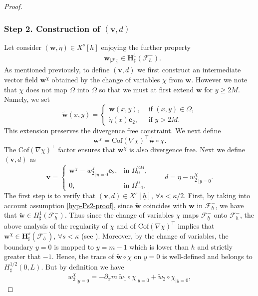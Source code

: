 \documentclass[JEP,XML,SOM,Unicode,NoFloatCountersInSection]{cedram}
\let\mathcal\mathscr
\theoremstyle{remark}
\theoremstyle{definition}
\newcommand{\vg}{\boldsymbol{v}}
\newcommand{\wg}{\boldsymbol{w}}
\newcommand{\BS}[1]{\boldsymbol{#1}}
\newcommand{\etap}{\dot{\eta}}
\newcommand{\hb}{{\underline{h}}}
\newcommand{\Cof}{\mathrm{Cof}}
\begin{document}
\begin{proof}
\subsubsection*{Step 2. Construction of $(\vg,d)$}
Let consider $(\wg,\etap) \in X^s[h]$ enjoying the further property
\begin{eqnarray}
&\wg_{\vert\mathcal{F}_{h}^{-}}\in \BS{H}^{1}_{\sharp}(\mathcal{F}^{-}_{h}).\label{hyp-Ps2-proof}
\end{eqnarray}
As mentioned previously, to define $(\vg,d)$ we first construct an intermediate vector field
$\wg^{\chi}$ obtained by the change of variables $\chi$ from $\wg$. However we note that
$\chi$ does not map $\Omega$ into $\Omega$ so that we must at first extend $\wg$ for
$y\geq 2 M$. Namely, we set
\[
\tilde{\wg}(x,y) =
\begin{cases}
\wg(x,y), & \text{ if $(x,y) \in \Omega$}, \\
\etap(x)\BS{e}_{2}, & \text{ if $y >2M$}.
\end{cases}
\]
This extension preserves the divergence free constraint.
We next define
\[\wg^\chi = \Cof(\nabla \chi)^{\top}\tilde{\wg}\circ \chi.\]
The $\Cof(\nabla \chi)^{\top}$ factor ensures that $\wg^\chi$ is also divergence free.
Next we define $(\vg,d)$ as
\begin{equation}\label{def.v.b}
\vg=\begin{cases}
\wg^\chi -{w_{2}^\chi}_{|{y=0}}\BS{e}_{2}, & \text{in } \Omega^{2M}_{0},\\
0, & \text{in }\Omega^{0}_{-1},
\end{cases}
\qquad
d=\etap -{w_{2}^\chi}_{|{y=0}}.
\end{equation}
The first step is to verify that $(\vg, d) \in X^s[\hb]$, $\forall s<\kappa/2$. First, by taking into account assumption \eqref{hyp-Ps2-proof}, since $\tilde{\wg}$ coincides with $\wg$ in $\mathcal F_{h}^{-}$, we have that $\tilde{\wg}\in H_\sharp^1(\mathcal F_{h}^{-})$. Thus since the change of variables $\chi$ maps $\mathcal{F}^-_{\hb}$ onto $\mathcal{F}^-_{h}$, the above analysis of the regularity of $\chi$ and of $ \Cof(\nabla \chi)^{\top}$ implies that $\wg^\chi\in \BS{H}^s_\sharp(\mathcal{F}^-_{\hb})$, $\forall s<\kappa$ (see \cite[Prop.\,B.1]{Grubsolo} ). Moreover, by the change of variables, the boundary $y=0$ is mapped to $y= m-1 $ which is lower than $h$ and strictly greater that $-1$. Hence, the trace of $\tilde{\wg} \circ \chi$ on $y=0$ is well-defined and belongs to $ H^{1/2}_{\sharp}(0,L)$.
But by definition we have
\[
{w_{2}^\chi}_{|{y=0}} = -\partial_x m \ \tilde{w}_{1}\circ\chi_{|{y=0}}+\tilde{w}_{2}\circ\chi_{|{y=0}},
\]
\end{proof}
\end{document}
